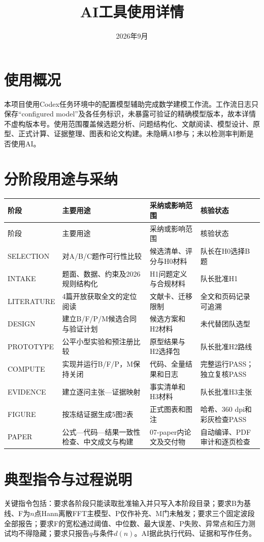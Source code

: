 \documentclass[UTF8,11pt,a4paper]{ctexart}
\title{AI工具使用详情}\author{}\date{2026年9月}
\begin{document}
\maketitle
\section{使用概况}
本项目使用Codex任务环境中的配置模型辅助完成数学建模工作流。工作流日志只保存“configured model”及各任务标识，未暴露可验证的精确模型版本，故本详情不虚构版本号。使用范围覆盖候选题分析、问题结构化、文献阅读、模型设计、原型、正式计算、证据整理、图表和论文构建。未隐瞒AI参与；未以检测率判断是否使用AI。

\section{分阶段用途与采纳}
\scriptsize
\begin{longtable}{p{2.0cm}p{4.3cm}p{4.1cm}p{2.8cm}}
\toprule 阶段&主要用途&采纳或影响范围&核验状态\\\midrule\endfirsthead
\toprule 阶段&主要用途&采纳或影响范围&核验状态\\\midrule\endhead
SELECTION&对A/B/C题作可行性比较&候选清单、评分与H0材料&队长在H0选择B题\\
INTAKE&题面、数据、约束及2026规则结构化&H1问题定义与合规材料&队长批准H1\\
LITERATURE&4篇开放获取全文的定位阅读&文献卡、迁移限制&全文和页码记录可追溯\\
DESIGN&建立B/F/P/M候选合同与验证计划&候选方案和H2材料&未代替团队选型\\
PROTOTYPE&公平小型实验和预注册比较&原型结果与H2选择包&队长批准H2路线\\
COMPUTE&实现并运行B/F/P，M保持关闭&代码、全量结果和日志&完整运行PASS；独立复核PASS\\
EVIDENCE&建立逐问主张—证据映射&事实清单和H3材料&队长批准H3主张\\
FIGURE&按冻结证据生成5图2表&正式图表和图注&哈希、360 dpi和彩灰检查PASS\\
PAPER&公式—代码—结果一致性检查、中文成文与构建&07-paper内论文及交付物&自动编译、PDF审计和逐页检查\\
\bottomrule
\end{longtable}
\normalsize
\section{典型指令与过程说明}
关键指令包括：要求各阶段只能读取批准输入并只写入本阶段目录；要求B为基线、F为$n$点Hann离散FFT主模型、P仅作补充、M门未触发；要求三个固定波段全部报告；要求F的宽松通过阈值、中位数、最大误差、P失败、异常点和压力测试均不得隐藏；要求只报告$q$与条件$d(n)$。AI据此执行代码、证据和写作任务。
\end{document}
